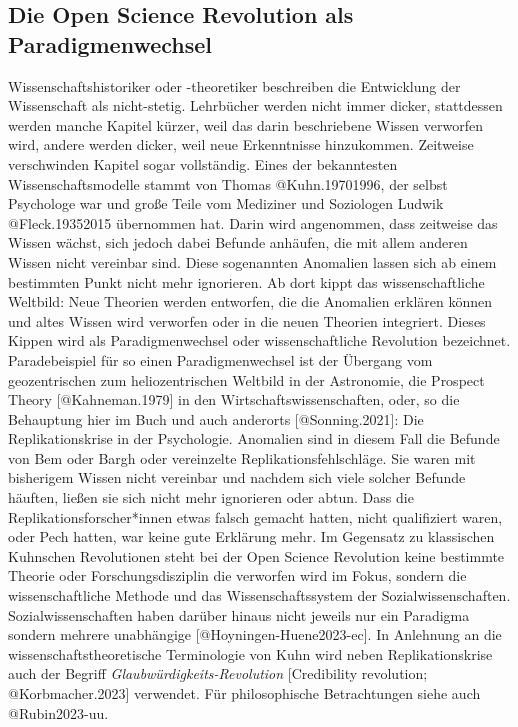 \documentclass[
  letterpaper,
  DIV=11,
  numbers=noendperiod]{scrreprt}
\begin{document}
\subsection{Die Open Science Revolution als
Paradigmenwechsel}\label{die-open-science-revolution-als-paradigmenwechsel}

Wissenschaftshistoriker oder -theoretiker beschreiben die Entwicklung
der Wissenschaft als nicht-stetig. Lehrbücher werden nicht immer dicker,
stattdessen werden manche Kapitel kürzer, weil das darin beschriebene
Wissen verworfen wird, andere werden dicker, weil neue Erkenntnisse
hinzukommen. Zeitweise verschwinden Kapitel sogar vollständig. Eines der
bekanntesten Wissenschaftsmodelle stammt von Thomas @Kuhn.19701996, der
selbst Psychologe war und große Teile vom Mediziner und Soziologen
Ludwik @Fleck.19352015 übernommen hat. Darin wird angenommen, dass
zeitweise das Wissen wächst, sich jedoch dabei Befunde anhäufen, die mit
allem anderen Wissen nicht vereinbar sind. Diese sogenannten Anomalien
lassen sich ab einem bestimmten Punkt nicht mehr ignorieren. Ab dort
kippt das wissenschaftliche Weltbild: Neue Theorien werden entworfen,
die die Anomalien erklären können und altes Wissen wird verworfen oder
in die neuen Theorien integriert. Dieses Kippen wird als
Paradigmenwechsel oder wissenschaftliche Revolution bezeichnet.
Paradebeispiel für so einen Paradigmenwechsel ist der Übergang vom
geozentrischen zum heliozentrischen Weltbild in der Astronomie, die
Prospect Theory {[}@Kahneman.1979{]} in den Wirtschaftswissenschaften,
oder, so die Behauptung hier im Buch und auch anderorts
{[}@Sonning.2021{]}: Die Replikationskrise in der Psychologie. Anomalien
sind in diesem Fall die Befunde von Bem oder Bargh oder vereinzelte
Replikationsfehlschläge. Sie waren mit bisherigem Wissen nicht vereinbar
und nachdem sich viele solcher Befunde häuften, ließen sie sich nicht
mehr ignorieren oder abtun. Dass die Replikationsforscher*innen etwas
falsch gemacht hatten, nicht qualifiziert waren, oder Pech hatten, war
keine gute Erklärung mehr. Im Gegensatz zu klassischen Kuhnschen
Revolutionen steht bei der Open Science Revolution keine bestimmte
Theorie oder Forschungsdisziplin die verworfen wird im Fokus, sondern
die wissenschaftliche Methode und das Wissenschaftssystem der
Sozialwissenschaften. Sozialwissenschaften haben darüber hinaus nicht
jeweils nur ein Paradigma sondern mehrere unabhängige
{[}@Hoyningen-Huene2023-ec{]}. In Anlehnung an die
wissenschaftstheoretische Terminologie von Kuhn wird neben
Replikationskrise auch der Begriff \emph{Glaubwürdigkeits-Revolution}
{[}Credibility revolution; @Korbmacher.2023{]} verwendet. Für
philosophische Betrachtungen siehe auch @Rubin2023-uu.
\end{document}
